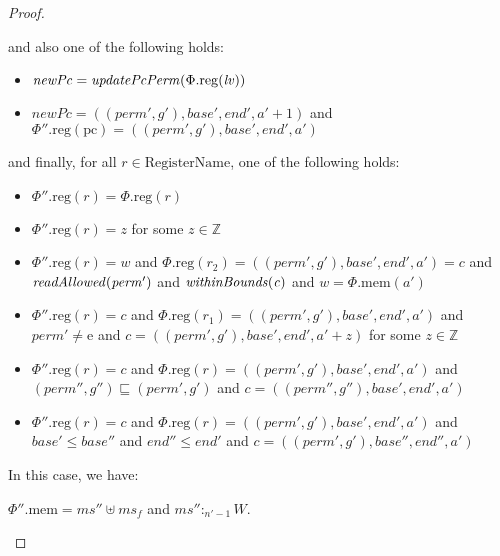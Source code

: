 \documentclass[a4paper]{article}
\newcommand{\update}[2]{[#1 \mapsto #2]}
\newcommand{\var}[1]{\mathit{#1}}
\newcommand{\hs}{\var{ms}}
\newcommand{\ms}{\hs}
\newcommand{\lv}{\var{lv}}
\newcommand{\gl}{\var{g}}
\newcommand{\pcreg}{\mathrm{pc}}
\newcommand{\addr}{\var{a}}
\newcommand{\start}{\var{base}}
\newcommand{\addrend}{\var{end}}
\newcommand{\heap}{\var{mem}}
\newcommand{\perm}{\var{perm}}
\newcommand{\plainproj}[1]{\mathrm{#1}}
\newcommand{\memheap}[1][\Phi]{#1.\plainproj{mem}}
\newcommand{\memreg}[1][\Phi]{#1.\plainproj{reg}}
\newcommand{\plainfun}[2]{
  \ifthenelse{\equal{#2}{}}
  {\mathit{#1}}
  {\mathit{#1}(#2)}
}
\newcommand{\updatePcPerm}[1]{\plainfun{updatePcPerm}{#1}}
\newcommand{\readAllowed}[1]{\plainfun{readAllowed}{#1}}
\newcommand{\writeAllowed}[1]{\plainfun{writeAllowed}{#1}}
\newcommand{\withinBounds}[1]{\plainfun{withinBounds}{#1}}
\newcommand{\heapSat}[3][\heap]{#1 :_{#2} #3}
\newcommand{\plaindom}[1]{\mathrm{#1}}
\newcommand{\RegName}{\plaindom{RegisterName}}
\newcommand{\ints}{\mathbb{Z}}
\newcommand{\plainperm}[1]{\mathrm{#1}}
\newcommand{\entry}{\plainperm{e}}
\begin{document}
\begin{proof}
\begin{enumproof}
    and also one of the following holds:
    \begin{itemize}
    \item $\var{newPc}= \updatePcPerm{\memreg(\lv)}$
    \item $\var{newPc} = ((\perm',\gl'),\start',\addrend',\addr' + 1)$ and
      $\memreg[\Phi''](\pcreg) = ((\perm',\gl'),\start',\addrend',\addr')$
    \end{itemize}
    and finally, for all $r \in \RegName$, one of the following
    holds:
    \begin{itemize}
    \item $\memreg[\Phi''](r) = \memreg[\Phi](r)$
    \item $\memreg[\Phi''](r) = z$ for some $z \in \ints$
    \item $\memreg[\Phi''](r) = \var{w}$ and $\memreg(r_2) =
      ((\perm',\gl'),\start',\addrend',\addr') = \var{c}$ and
      $\readAllowed{\perm'}$ and $\withinBounds{\var{c}}$ and $\var{w} =
      \memheap(\addr')$
    \item $\memreg[\Phi''](r) = \var{c}$ and $\memreg(r_1) =
      ((\perm',\gl'),\start',\addrend',\addr')$ and $\perm' \neq \entry$ and
      $\var{c} = ((\perm',\gl'),\start',\addrend',\addr' + z)$ for some $z \in
      \ints$
    \item $\memreg[\Phi''](r) = \var{c}$ and $\memreg(r) =
      ((\perm',\gl'),\start',\addrend',\addr')$ and $(\perm'',\gl'')\sqsubseteq
      (\perm',\gl')$ and $c = ((\perm'',\gl''),\start',\addrend',\addr')$
    \item $\memreg[\Phi''](r) = \var{c}$ and $\memreg(r) =
      ((\perm',\gl'),\start',\addrend',\addr')$ and $\start' \leq \start''$ and
      $\addrend'' \leq \addrend'$ and $c =
      ((\perm',\gl'),\start'',\addrend'',\addr')$
    \end{itemize}
    In this case, we have:
    \begin{enumproof}
    \item $\memheap[\Phi''] = \ms'' \uplus \ms_f$ and $\heapSat[\ms'']{n'-1}{W}$.
\end{enumproof}
\end{enumproof}
\end{proof}
\end{document}
